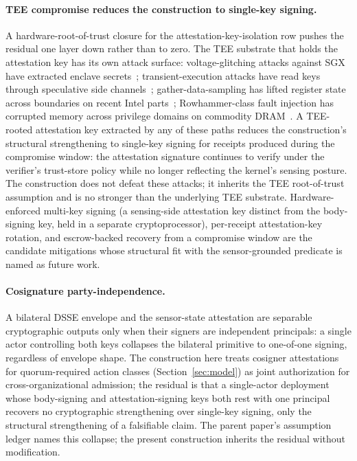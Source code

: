 \paragraph{TEE compromise reduces the construction to single-key signing.}
A hardware-root-of-trust closure for the attestation-key-isolation row pushes the residual one layer down rather than to zero. The TEE substrate that holds the attestation key has its own attack surface: voltage-glitching attacks against SGX have extracted enclave secrets~\cite{murdockPlundervolt2020}; transient-execution attacks have read keys through speculative side channels~\cite{vanbulckForeshadow2018}; gather-data-sampling has lifted register state across boundaries on recent Intel parts~\cite{moghimiDownfall2024}; Rowhammer-class fault injection has corrupted memory across privilege domains on commodity DRAM~\cite{koglerHalfDouble2022}. A TEE-rooted attestation key extracted by any of these paths reduces the construction's structural strengthening to single-key signing for receipts produced during the compromise window: the attestation signature continues to verify under the verifier's trust-store policy while no longer reflecting the kernel's sensing posture. The construction does not defeat these attacks; it inherits the TEE root-of-trust assumption and is no stronger than the underlying TEE substrate. Hardware-enforced multi-key signing (a sensing-side attestation key distinct from the body-signing key, held in a separate cryptoprocessor), per-receipt attestation-key rotation, and escrow-backed recovery from a compromise window are the candidate mitigations whose structural fit with the sensor-grounded predicate is named as future work.

\paragraph{Cosignature party-independence.}
A bilateral DSSE envelope and the sensor-state attestation are separable cryptographic outputs only when their signers are independent principals: a single actor controlling both keys collapses the bilateral primitive to one-of-one signing, regardless of envelope shape. The construction here treats cosigner attestations for quorum-required action classes (Section~\ref{sec:model}) as joint authorization for cross-organizational admission; the residual is that a single-actor deployment whose body-signing and attestation-signing keys both rest with one principal recovers no cryptographic strengthening over single-key signing, only the structural strengthening of a falsifiable claim. The parent paper's assumption ledger names this collapse; the present construction inherits the residual without modification.

